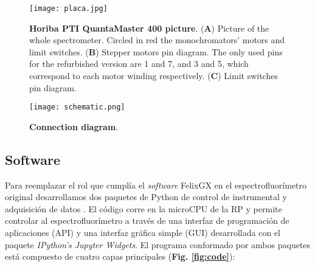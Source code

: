 
\begin{figure}[h]
     \centering
     \texttt{[image: placa.jpg]}
     \caption{\textbf{Horiba PTI QuantaMaster 400 picture}.  (\textbf{A}) Picture of the whole spectrometer. Circled in red the monochromators' motors and limit switches. (\textbf{B}) Stepper motors pin diagram. The only used pins for the refurbished version are 1 and 7, and 3 and 5, which correspond to each motor winding respectively. (\textbf{C}) Limit switches pin diagram.}
     \label{fig:placa}
\end{figure}

\begin{figure}[h]
     \centering
     \texttt{[image: schematic.png]}
     \caption{\textbf{Connection diagram}.
     }
     \label{fig:schematic}
\end{figure}

\subsection{Software}

Para reemplazar el rol que cumplía el \textit{software} FelixGX en el espectrofluorímetro original desarrollamos dos paquetes de Python de control de instrumental y adquisición de datos \cite{napoli_tdinapoli_2024,grecco_hgrecco_2024}.
El código corre en la microCPU de la RP y permite controlar al espectrofluorímetro a través de una interfaz de programación de aplicaciones (API) y una interfaz gráfica simple (GUI) desarrollada con el paquete \textit{IPython's Jupyter Widgets}.
El programa conformado por ambos paquetes está compuesto de cuatro capas principales (\textbf{Fig. \ref{fig:code}}):

